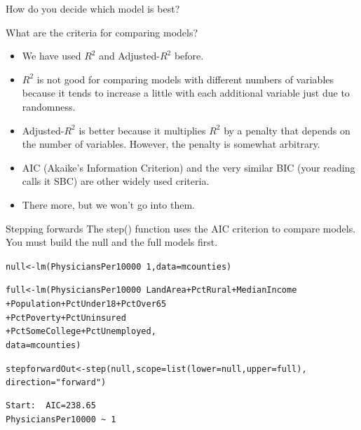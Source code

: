 \documentclass{beamer}\usepackage[]{graphicx}\usepackage[]{color}
\makeatletter
\newcommand{\hlnum}[1]{\textcolor[rgb]{0.824,0.412,0.118}{#1}}%
\newcommand{\hlstr}[1]{\textcolor[rgb]{1,0.894,0.71}{#1}}%
\newcommand{\hlopt}[1]{\textcolor[rgb]{1,0.894,0.769}{#1}}%
\newcommand{\hlstd}[1]{\textcolor[rgb]{1,0.894,0.769}{#1}}%
\newcommand{\hlkwb}[1]{\textcolor[rgb]{0.804,0.776,0.451}{#1}}%
\newcommand{\hlkwc}[1]{\textcolor[rgb]{0.78,0.941,0.545}{#1}}%
\newcommand{\hlkwd}[1]{\textcolor[rgb]{1,0.78,0.769}{#1}}%
\newenvironment{kframe}{%
 \def\at@end@of@kframe{}%
 \ifinner\ifhmode%
  \def\at@end@of@kframe{\end{minipage}}%
  \begin{minipage}{\columnwidth}%
 \fi\fi%
 \def\FrameCommand##1{\hskip\@totalleftmargin \hskip-\fboxsep
 \colorbox{shadecolor}{##1}\hskip-\fboxsep
     \hskip-\linewidth \hskip-\@totalleftmargin \hskip\columnwidth}%
 \MakeFramed {\advance\hsize-\width
   \@totalleftmargin\z@ \linewidth\hsize
   \@setminipage}}%
 {\par\unskip\endMakeFramed%
 \at@end@of@kframe}
\newenvironment{knitrout}{}{} %
\makeatother
\begin{document}
\begin{darkframes}
\begin{frame}[fragile]{How do you decide which model is best?}
    \end{frame}  


    \begin{frame}[fragile]{What are the criteria for comparing models?}
      \begin{itemize}[<+->]
        \item We have used $R^2$ and Adjusted-$R^2$ before.
        \item $R^2$ is not good for comparing models with different numbers of variables because it tends to increase a little with each additional variable just due to randomness.
        \item Adjusted-$R^2$ is better because it multiplies $R^2$ by a penalty that depends on the number of variables. However, the penalty is somewhat arbitrary.
        \item AIC (Akaike’s Information Criterion) and the very similar BIC (your reading calls it SBC) are other widely used criteria.
        \item There more, but we won't go into them.
 
      \end{itemize} 
    \end{frame}


    \begin{frame}[fragile]{Stepping forwards}
       The step() function uses the AIC criterion to compare models. You must build the null and the full models first.

      \fontsize{8}{8}\selectfont

\begin{knitrout}
\begin{kframe}
\begin{alltt}
\hlstd{null} \hlkwb{<-} \hlkwd{lm}\hlstd{(PhysiciansPer10000}\hlopt{~}\hlnum{1}\hlstd{,} \hlkwc{data}\hlstd{=mcounties)}

\hlstd{full} \hlkwb{<-} \hlkwd{lm}\hlstd{(PhysiciansPer10000} \hlopt{~} \hlstd{LandArea} \hlopt{+} \hlstd{PctRural} \hlopt{+} \hlstd{MedianIncome}
                              \hlopt{+} \hlstd{Population} \hlopt{+} \hlstd{PctUnder18} \hlopt{+} \hlstd{PctOver65}
                              \hlopt{+} \hlstd{PctPoverty} \hlopt{+} \hlstd{PctUninsured}
                              \hlopt{+} \hlstd{PctSomeCollege} \hlopt{+} \hlstd{PctUnemployed,}
                              \hlkwc{data}\hlstd{=mcounties)}

\hlstd{stepforwardOut} \hlkwb{<-} \hlkwd{step}\hlstd{(null,} \hlkwc{scope}\hlstd{=}\hlkwd{list}\hlstd{(}\hlkwc{lower}\hlstd{=null,} \hlkwc{upper}\hlstd{=full),}
                             \hlkwc{direction} \hlstd{=}\hlstr{"forward"}\hlstd{)}
\end{alltt}
\begin{verbatim}
Start:  AIC=238.65
PhysiciansPer10000 ~ 1


\end{verbatim}
\end{kframe}
\end{knitrout}
\end{frame}
\end{darkframes}
\end{document}
